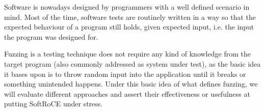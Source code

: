 Software is nowadays designed by programmers with a well defined scenario in mind. Most of the time, software tests
are routinely written in a way so that the expected behaviour of a program still holds, given expected input, i.e. the input
the program was designed for.

Fuzzing is a testing technique does not require any kind of knowledge from the target program (also commonly addressed as system under test),
as the basic idea it bases upon is to throw random input into the application until it breaks or something unintended happens. Under
this basic idea of what defines fuzzing, we will evaluate different approaches and assert their effectiveness or usefulness
at putting SoftRoCE under stress.
